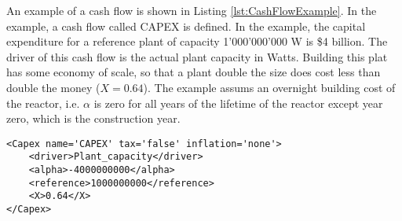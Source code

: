 An example of a cash flow is shown in Listing \ref{lst:CashFlowExample}. In the example, a cash flow called CAPEX is defined.
In the example, the capital expenditure for a reference plant of capacity
 1'000'000'000 W is \$4 billion. The driver of this cash flow is the actual plant capacity in Watts. Building this plat has some economy
 of scale, so that a plant double the size does cost
less than double the money ($X=0.64$). The example assums an overnight building cost of the reactor, i.e. $\alpha$ is zero for
all years of the lifetime of the reactor except year zero, which is the construction year.

\begin{lstlisting}[style=XML,morekeywords={anAttribute},caption=CashFlow input example., label=lst:CashFlowExample]
<Capex name='CAPEX' tax='false' inflation='none'>
    <driver>Plant_capacity</driver>
    <alpha>-4000000000</alpha>
    <reference>1000000000</reference>
    <X>0.64</X>
</Capex>
\end{lstlisting}
